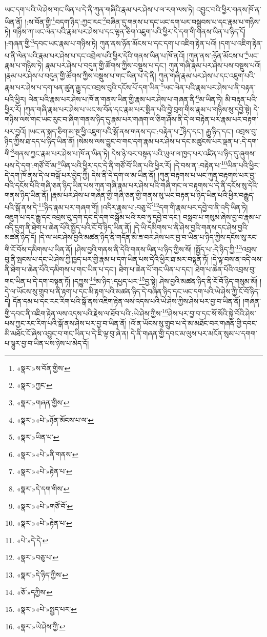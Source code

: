 ཡང་དག་པའི་ཡེ་ཤེས་གང་ཡིན་པ་དེ་ནི་ཀུན་གཞིའི་རྣམ་པར་ཤེས་པ་ལ་རག་ལས་ཏེ། འབྱུང་བའི་ཕྱིར་གནས་ཁོ་ན་ཡིན་ནོ། །:ས་བོན་གྱི་\footnote{«སྣར་»ས་བོན་གྱིས་}བདག་ཉིད་:ཀྱང་རང་\footnote{«སྣར་»ཀྱང་}བཞིན་དུ་གནས་པ་དང་ཡང་དག་པར་བསྒྲུབས་པ་དང་རྣམ་པ་གཉིས་ཏེ། གཉིས་ཀ་ཡང་ལེན་པའི་རྣམ་པར་ཤེས་པ་དང་ལྷན་ཅིག་འཇུག་པའི་ཕྱིར་དེ་དག་གི་གནས་ཡིན་པ་ཉིད་དོ། །:གཞན་གྱི་\footnote{«སྣར་»གཞན་གྱིས་}དབང་ཡང་རྣམ་པ་གཉིས་ཏེ། ཀུན་ནས་ཉོན་མོངས་པ་དང་དག་པ་འཇིག་རྟེན་པའོ། །དག་པ་འཇིག་རྟེན་པ་ནི་ལེན་པའི་རྣམ་པར་ཤེས་པ་དང་འབྲེལ་པའི་ཕྱིར་དེའི་གནས་ཡིན་པ་ཁོ་ནའོ། །ཀུན་ནས་:ཉོན་མོངས་པ་\footnote{«སྣར་»«པེ་»ཉོན་མོངས་པ་ལ་}ཡང་རྣམ་པ་གཉིས་ཏེ། རྣམ་པར་ཤེས་པ་བདུན་གྱི་ཚོགས་ཀྱིས་བསྡུས་པ་དང་། ཀུན་གཞི་རྣམ་པར་ཤེས་པས་བསྡུས་པའོ། །རྣམ་པར་ཤེས་པ་བདུན་གྱི་ཚོགས་ཀྱིས་བསྡུས་པ་གང་ཡིན་པ་དེ་ནི། ཀུན་གཞི་རྣམ་པར་ཤེས་པ་དང་འཇུག་པའི་རྣམ་པར་ཤེས་པ་དག་ཕན་ཚུན་རྒྱུ་དང་འབྲས་བུའི་དངོས་པོ་དག་ཡིན་\footnote{«སྣར་»ཡིན་པ་}ཡང་ལེན་པའི་རྣམ་པར་ཤེས་པ་ནི་བརྟན་པའི་ཕྱིར། ལེན་པའི་རྣམ་པར་ཤེས་པ་ཁོ་ན་གནས་ཡིན་གྱི་རྣམ་པར་ཤེས་པ་གཞན་ནི་\footnote{«སྣར་»«པེ་»ནི་གནས་}མ་ཡིན་ཏེ། མི་བརྟན་པའི་ཕྱིར་རོ། །ཀུན་གཞི་རྣམ་པར་ཤེས་པ་ཡང་ས་བོན་དང་རྣམ་པར་སྨིན་པའི་བྱེ་བྲག་གིས་རྣམ་པ་གཉིས་སུ་དབྱེ་སྟེ། དེ་གཉིས་ལས་གང་ཡང་རུང་བ་ཞིག་གནས་ཉིད་དུ་རྣམ་པར་གཞག་ལ་ཅིག་ཤོས་ནི་དེ་ལ་བརྟེན་པར་རྣམ་པར་བརྟག་པར་བྱའོ། །ཡང་ན་སྐད་ཅིག་མ་སྔ་ཕྱི་འཇུག་པའི་སྒོ་ནས་གནས་དང་:བརྟེན་པ་\footnote{«སྣར་»«པེ་»རྟེན་པ་}ཉིད་དང་། རྒྱུ་ཉིད་དང་། འབྲས་བུ་ཉིད་ཀྱིས་ཐ་དད་པ་ཉིད་ཡིན་ནོ། །སེམས་ལས་བྱུང་བ་གང་དག་རྣམ་པར་ཤེས་པ་དང་མཚུངས་པར་ལྡན་པ་:དེ་དག་གི་\footnote{«སྣར་»དེ་དག་གིས་}གནས་ཀྱང་རྣམ་པར་ཤེས་པ་ཁོ་ན་ཡིན་ཏེ། དེས་ཉེ་བར་བསྟན་པའི་ཡུལ་ལ་ཁྱད་པར་འཛིན་པ་ཉིད་དུ་ཞུགས་པས་དེ་དག་:གཙོ་བོ་མ་\footnote{«སྣར་»«པེ་»གཙོ་བོ་}ཡིན་པའི་ཕྱིར་དང་དེ་ནི་གཙོ་བོ་ཡིན་པའི་ཕྱིར་རོ། །དེ་བས་ན་:བརྟེན་པ་\footnote{«སྣར་»«པེ་»རྟེན་པ་}ཡིན་པའི་ཕྱིར་དེ་དག་ཁོ་ནས་དེ་ལ་བསྒོ་པར་བྱེད་ཀྱི། དེས་ནི་དེ་དག་ལ་མ་ཡིན་ནོ། །ཀུན་བརྟགས་པ་ཡང་ཀུན་བརྟགས་པར་བྱ་བའི་དངོས་པོའི་གཞི་ཅན་ཉིད་ཡིན་པས་ཀུན་གཞི་རྣམ་པར་ཤེས་པའི་གཞི་གང་ལ་བརྟགས་པ་དེ་ནི་དངོས་སུ་དེའི་གནས་ཉིད་ཡིན་ནོ། །རྣམ་པར་ཤེས་པ་གཞན་གྱི་གཞི་ཅན་གྱི་གནས་སུ་ཡང་བརྟན་པ་ཉིད་ཡིན་པའི་ཕྱིར་བརྒྱུད་པའི་སྒོ་ནས་དེ་\footnote{«པེ་»དེ་དེ་}ཉིད་རྣམ་པར་གཞག་གོ། །འདིར་རྣམ་པ་:བཅུ་པོ་\footnote{«སྣར་»བཅུ་པ་}དག་གི་རྣམ་པར་དབྱེ་བ་ནི་འདི་ཡིན་ཏེ། འཇུག་པ་དང་རྒྱུ་དང་འབྲས་བུ་དག་དང་དེ་དག་བསྒོམ་པའི་རབ་ཏུ་དབྱེ་བ་དང་། བསླབ་པ་གསུམ་ཞེས་བྱ་བ་རྣམ་པ་འདི་དྲུག་ནི་ཐེག་པ་ཆེན་པོའི་སྤྱོད་པའི་ངོ་བོ་ཉིད་ཡིན་ནོ། །དེ་ཡི་དམིགས་པ་ནི་ཤེས་བྱའི་གནས་དང་ཤེས་བྱའི་མཚན་ཉིད་དོ། །དེ་ལ་ཡང་ཤེས་བྱའི་མཚན་ཉིད་ནི་གདོན་མི་ཟ་བར་ཤེས་པར་བྱ་བ་ཡིན་པ་ཉིད་ཀྱིས་དངོས་སུ་རང་གི་ངོ་བོས་དམིགས་པ་ཡིན་ནོ། །ཤེས་བྱའི་གནས་ནི་དེའི་གནས་ཡིན་པ་ཉིད་ཀྱིས་སོ། །སྤྱོད་པ་:དེ་ཉིད་ཀྱི་\footnote{«སྣར་»དེ་ཉིད་ཀྱིས་}འབྲས་བུ་ནི་སྤངས་པ་དང་ཡེ་ཤེས་ཀྱི་ཁྱད་པར་གྱི་རྣམ་པ་དག་ཡིན་པས་དེའི་ཕྱིར་ཐ་མར་བསྟན་ཏོ། །དེ་ལྟ་བས་ན་འདི་ལས་ནི་ཐེག་པ་ཆེན་པོའི་དམིགས་པ་གང་ཡིན་པ་དང་། ཐེག་པ་ཆེན་པོ་གང་ཡིན་པ་དང་། ཐེག་པ་ཆེན་པོའི་འབྲས་བུ་གང་ཡིན་པ་དེ་དག་བསྟན་ཏོ། །དཀྱུས་\footnote{«ཅོ་»དཀྱིས་}མ་ཉིད་:དཔྱད་པར་\footnote{«སྣར་»«པེ་»སྤྱད་པར་}བྱ་སྟེ། ཤེས་བྱའི་མཚན་ཉིད་ནི་ངོ་བོ་ཉིད་གསུམ་མོ། །དེ་ལ་ཡོངས་སུ་གྲུབ་པ་ནི་རྟག་པ་དང་མི་རྟག་པའི་མཚན་ཉིད་དེ་བཞིན་ཉིད་དང་ཡང་དག་པའི་ཡེ་ཤེས་ཀྱི་ངོ་བོ་ཉིད་དེ། དོན་དམ་པ་དང་རང་རིག་པའི་སྒོ་ནས་འཇིག་རྟེན་ལས་འདས་པའི་ཡེ་ཤེས་ཀྱིས་ཤེས་པར་བྱ་བ་ཡིན་ནོ། །གཞན་གྱི་དབང་ནི་འཇིག་རྟེན་ལས་འདས་པའི་རྗེས་ལ་ཐོབ་པའི་:ཡེ་ཤེས་ཀྱིས་\footnote{«སྣར་»ཡེ་ཤེས་ཀྱི་}ཤེས་པར་བྱ་བ་དང་སོ་སོའི་སྐྱེ་བོའི་ཤེས་པས་ཀྱང་རང་རིག་པའི་སྒོ་ནས་ཤེས་པར་བྱ་བ་ཡིན་ནོ། །འོ་ན་ཡོངས་སུ་གྲུབ་པ་དེ་མ་མཐོང་བར་གཞན་གྱི་དབང་མི་མཐོང་ངོ་ཞེས་འབྱུང་བ་གང་ཡིན་པ་དེ་ཇི་ལྟ་བུ་ཞེ་ན། དེ་ནི་གཞན་གྱི་དབང་མ་ལུས་པར་མངོན་སུམ་པ་དགག་པ་ལྷུར་བྱ་བ་ཡིན་པས་ཉེས་པ་མེད་དོ། 